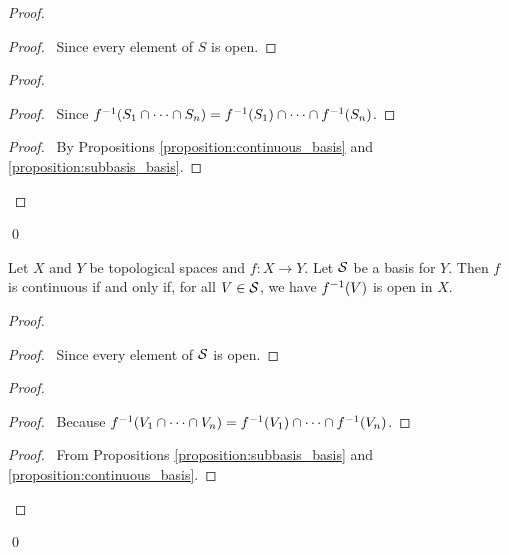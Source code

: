 \begin{proof}
    \pf
    \begin{proof}
        \pf\ Since every element of $S$ is open.
    \end{proof}
    \begin{proof}
        \begin{proof}
            \pf\ Since ${f}^{-1}(S_1 \cap \cdots \cap S_n) = {f}^{-1}(S_1) \cap \cdots \cap {f}^{-1}(S_n)$.
        \end{proof}
        \qedstep
        \begin{proof}
            \pf\ By Propositions \ref{proposition:continuous_basis} and \ref{proposition:subbasis_basis}.
        \end{proof}
    \end{proof}
    \qed
\end{proof}

\begin{proposition}
    Let $X$ and $Y$ be topological spaces and $f : X \rightarrow Y$. Let $\mathcal{S}$ be a basis for $Y$. Then $f$
    is continuous if and only if, for all $V \in \mathcal{S}$, we have ${f}^{-1}(V)$ is open in $X$.
\end{proposition}

\begin{proof}
    \pf
    \begin{proof}
        \pf\ Since every element of $\mathcal{S}$ is open.
    \end{proof}
    \begin{proof}
        \begin{proof}
            \pf\ Because ${f}^{-1}(V_1 \cap \cdots \cap V_n) = {f}^{-1}(V_1) \cap \cdots \cap {f}^{-1}(V_n)$.
        \end{proof}
        \qedstep
        \begin{proof}
            \pf\ From Propositions \ref{proposition:subbasis_basis} and \ref{proposition:continuous_basis}.
        \end{proof}
    \end{proof}
    \qed
\end{proof}

